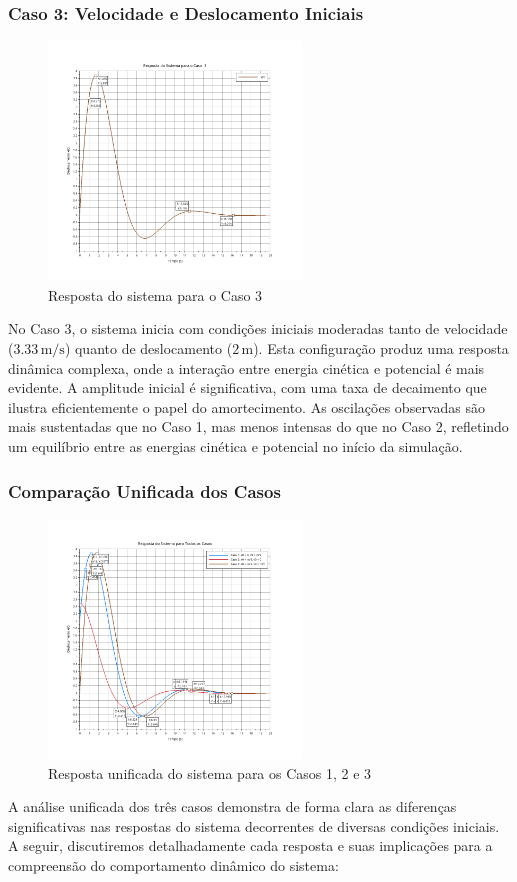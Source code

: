 \subsubsection{Caso 3: Velocidade e Deslocamento Iniciais}
\begin{figure}[H]
    \centering
    \includegraphics[width=0.6\textwidth]{atividades/1-atividade/assets/caso3.png}
    \caption{Resposta do sistema para o Caso 3}
\end{figure}
No Caso 3, o sistema inicia com condições iniciais moderadas tanto de velocidade (\(3.33 \, \text{m/s}\)) quanto de deslocamento (\(2 \, \text{m}\)). Esta configuração produz uma resposta dinâmica complexa, onde a interação entre energia cinética e potencial é mais evidente. A amplitude inicial é significativa, com uma taxa de decaimento que ilustra eficientemente o papel do amortecimento. As oscilações observadas são mais sustentadas que no Caso 1, mas menos intensas do que no Caso 2, refletindo um equilíbrio entre as energias cinética e potencial no início da simulação.

\subsubsection{Comparação Unificada dos Casos}
\begin{figure}[H]
    \centering
    \includegraphics[width=0.6\textwidth]{atividades/1-atividade/assets/caso-all-in-one.png}
    \caption{Resposta unificada do sistema para os Casos 1, 2 e 3}
\end{figure}
A análise unificada dos três casos demonstra de forma clara as diferenças significativas nas respostas do sistema decorrentes de diversas condições iniciais. A seguir, discutiremos detalhadamente cada resposta e suas implicações para a compreensão do comportamento dinâmico do sistema:

